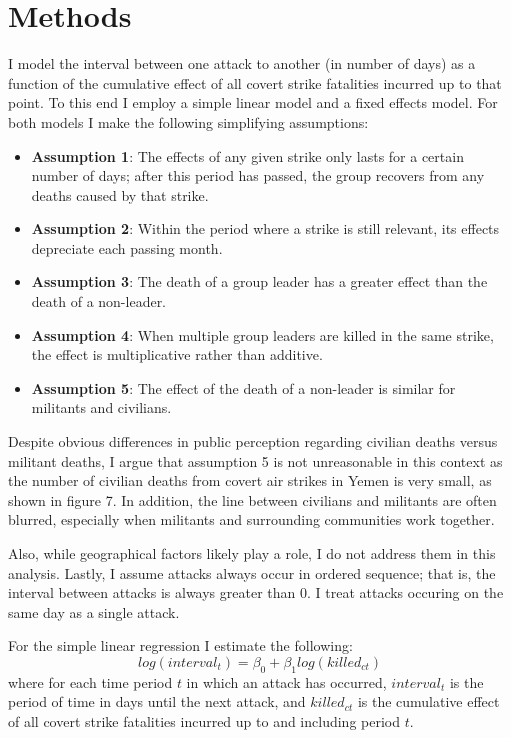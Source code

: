 \documentclass[letterpaper,12pt]{article}
\theoremstyle{definition}
\begin{document}
\section{Methods}
I model the interval between one attack to another (in number of days) as a function of the cumulative effect of all covert strike fatalities incurred up to that point. To this end I employ a simple linear model and a fixed effects model. For both models I make the following simplifying assumptions:
\begin{itemize}
  \item \textbf{Assumption 1}: The effects of any given strike only lasts for a certain number of days; after this period has passed, the group recovers from any deaths caused by that strike.
  \item \textbf{Assumption 2}: Within the period where a strike is still relevant, its effects depreciate each passing month.
  \item \textbf{Assumption 3}: The death of a group leader has a greater effect than the death of a non-leader.
  \item \textbf{Assumption 4}: When multiple group leaders are killed in the same strike, the effect is multiplicative rather than additive.
  \item \textbf{Assumption 5}: The effect of the death of a non-leader is similar for militants and civilians.
\end{itemize}
Despite obvious differences in public perception regarding civilian deaths versus militant deaths, I argue that assumption 5 is not unreasonable in this context as the number of civilian deaths from covert air strikes in Yemen is very small, as shown in figure 7. In addition, the line between civilians and militants are often blurred, especially when militants and surrounding communities work together.

Also, while geographical factors likely play a role, I do not address them in this analysis. Lastly, I assume attacks always occur in ordered sequence; that is, the interval between attacks is always greater than 0. I treat attacks occuring on the same day as a single attack. 

For the simple linear regression I estimate the following:
\[log\left(interval_t\right) = \beta_0 + \beta_1log\left(killed_{ct}\right) \]
where for each time period $t$ in which an attack has occurred, $interval_{t}$ is the period of time in days until the next attack, and $killed_{ct}$ is the cumulative effect of all covert strike fatalities incurred up to and including period $t$.
\end{document}
